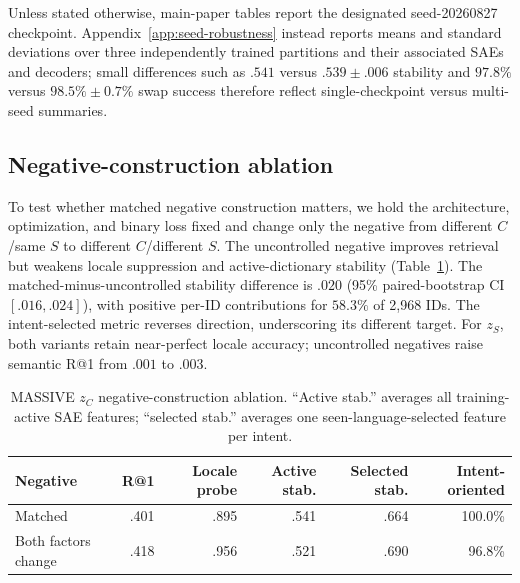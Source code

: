 \documentclass[11pt]{article}
\begin{document}
Unless stated otherwise, main-paper tables report the designated seed-20260827 checkpoint. Appendix~\ref{app:seed-robustness} instead reports means and standard deviations over three independently trained partitions and their associated SAEs and decoders; small differences such as $.541$ versus $.539\pm.006$ stability and $97.8\%$ versus $98.5\%\pm0.7\%$ swap success therefore reflect single-checkpoint versus multi-seed summaries.

\subsection{Negative-construction ablation}
\label{app:negative-ablation}
To test whether matched negative construction matters, we hold the architecture, optimization, and binary loss fixed and change only the negative from different $C$/same $S$ to different $C$/different $S$. The uncontrolled negative improves retrieval but weakens locale suppression and active-dictionary stability (Table~\ref{tab:negative-ablation}). The matched-minus-uncontrolled stability difference is $.020$ (95\% paired-bootstrap CI $[.016,.024]$), with positive per-ID contributions for $58.3\%$ of 2,968 IDs. The intent-selected metric reverses direction, underscoring its different target. For $z_S$, both variants retain near-perfect locale accuracy; uncontrolled negatives raise semantic R@1 from $.001$ to $.003$.

\begin{table}[H]
\centering\small
\caption{MASSIVE $z_C$ negative-construction ablation. ``Active stab.'' averages all training-active SAE features; ``selected stab.'' averages one seen-language-selected feature per intent.}
\label{tab:negative-ablation}
\begin{tabular*}{\columnwidth}{@{\extracolsep{\fill}}lrrrrr@{}}
\toprule
Negative & R@1 & Locale probe & Active stab. & Selected stab. & Intent-oriented \\
\midrule
Matched & .401 & .895 & .541 & .664 & 100.0\% \\
Both factors change & .418 & .956 & .521 & .690 & 96.8\% \\
\bottomrule
\end{tabular*}
\end{table}
\end{document}
